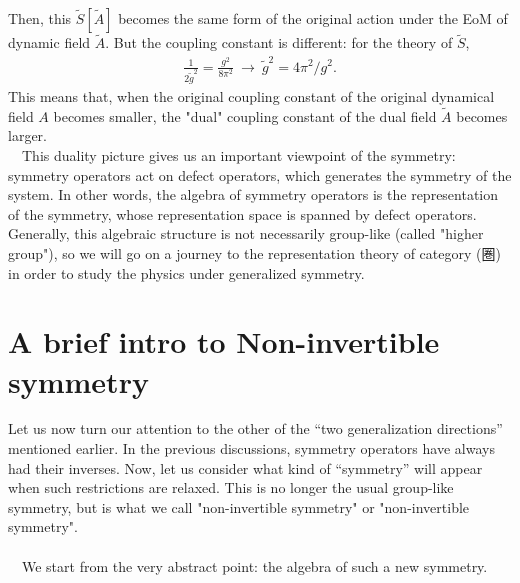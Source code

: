\documentclass{ltjsarticle}
\theoremstyle{mystyle} %
\numberwithin{equation}{section}
\begin{document}
Then, this $\tilde{S}[\tilde{A}]$ becomes the same form of the original action under the EoM of dynamic field $\tilde{A}$. 
But the coupling constant is different: for the theory of $\tilde{S}$, 
\begin{align}
    \frac{1}{2\tilde{g}^2} = \frac{g^2}{8\pi^2} ~\to~\tilde{g}^2 = 4\pi^2 / g^2.  
\end{align}
This means that, when the original coupling constant of the original dynamical field $A$ becomes smaller, 
the "dual" coupling constant of the dual field $\tilde{A}$ becomes larger. \\
　This duality picture gives us an important viewpoint of the symmetry: 
symmetry operators act on defect operators, which generates the symmetry of the system. 
In other words, the algebra of symmetry operators is the representation of the symmetry, 
whose representation space is spanned by defect operators. 
Generally, this algebraic structure is not necessarily group-like 
(called "higher group"), 
so we will go on a journey to the representation theory of category (圏) 
in order to study the physics under generalized symmetry. 
%
%
%
%
%
\newpage
\section{A brief intro to Non-invertible symmetry}
Let us now turn our attention to the other of the “two generalization directions” mentioned earlier. 
In the previous discussions, symmetry operators have always had their inverses. 
Now, let us consider what kind of “symmetry” will appear when such restrictions are relaxed. 
This is no longer the usual group-like symmetry, but is what we call "non-invertible symmetry" or "non-invertible symmetry". \\
\\
　We start from the very abstract point: the algebra of such a new symmetry. 
\end{document}

